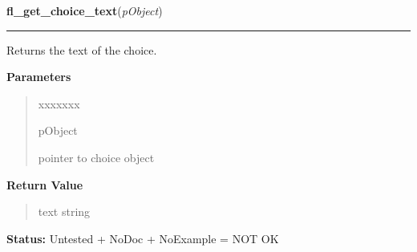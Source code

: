 \hspace{.8\funcindent}\begin{boxedminipage}{\funcwidth}

    \raggedright \textbf{fl\_get\_choice\_text}(\textit{pObject})

    \vspace{-1.5ex}

    \rule{\textwidth}{0.5\fboxrule}
\setlength{\parskip}{2ex}
    Returns the text of the choice.

\setlength{\parskip}{1ex}
      \textbf{Parameters}
      \vspace{-1ex}

      \begin{quote}
        \begin{Ventry}{xxxxxxx}

          \item[pObject]

          pointer to choice object

        \end{Ventry}

      \end{quote}

      \textbf{Return Value}
    \vspace{-1ex}

      \begin{quote}
      text string

      \end{quote}

\textbf{Status:} Untested + NoDoc + NoExample = NOT OK



    \end{boxedminipage}

    \label{xformslib:library:fl_set_choice_fontsize}

    \vspace{0.5ex}

